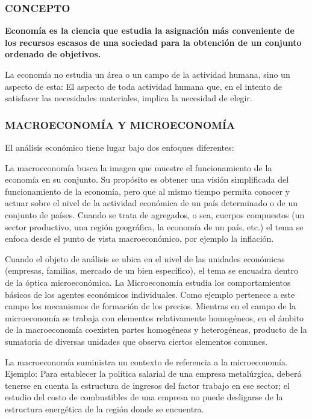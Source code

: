 \subsubsection*{CONCEPTO}

\begin{recuadro}
\textbf{Economía es la ciencia que estudia la asignación más conveniente de los recursos escasos} \textbf{de una sociedad para la obtención de un conjunto ordenado de objetivos.}
\end{recuadro}

La economía no estudia un área o un campo de la actividad humana, sino un aspecto de esta: El aspecto de toda actividad humana que, en el intento de satisfacer las necesidades materiales, implica la necesidad de elegir.



\subsubsection*{MACROECONOMÍA Y MICROECONOMÍA}
El análisis económico tiene lugar bajo dos enfoques diferentes:

La macroeconomía busca la imagen que muestre el funcionamiento de la economía en su conjunto. Su propósito es obtener una visión simplificada del funcionamiento de la economía, pero que al mismo tiempo permita conocer y actuar sobre el nivel de la actividad económica de un país determinado o de un conjunto de países. Cuando se trata de agregados, o sea, cuerpos compuestos (un sector productivo, una región geográfica, la economía de un país, etc.) el tema se enfoca desde el punto de vista macroeconómico, por ejemplo la inflación.

Cuando el objeto de análisis se ubica en el nivel de las unidades económicas (empresas, familias, mercado de un bien específico), el tema se encuadra dentro de la óptica microeconómica. La Microeconomía estudia los comportamientos básicos de los agentes económicos individuales. Como ejemplo pertenece a este campo los mecanismos de formación de los precios. Mientras en el campo de la microeconomía se trabaja con elementos relativamente homogéneos, en el ámbito de la macroeconomía coexisten partes homogéneas y heterogéneas, producto de la sumatoria de diversas unidades que observa ciertos elementos comunes.

La macroeconomía suministra un contexto de referencia a la microeconomía. Ejemplo: Para establecer la política salarial de una empresa metalúrgica, deberá tenerse en cuenta la estructura de ingresos del factor trabajo en ese sector; el estudio del costo de combustibles de una empresa no puede desligarse de la estructura energética de la región donde se encuentra.

